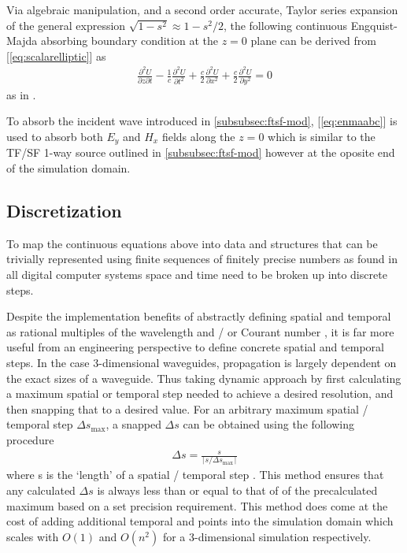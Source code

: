 Via algebraic manipulation, and a second order accurate, Taylor series expansion of the general expression $\sqrt{1-s^2}\approx1-s^2/2$, the following continuous Engquist-Majda absorbing boundary condition at the $z=0$ plane can be derived from  [\ref{eq:scalarelliptic}] as
\begin{align}
	\frac{\partial^2 U}{\partial z\partial t}-\frac{1}{c}\frac{\partial^2 U}{\partial t^2}+\frac{c}{2}\frac{\partial^2 U}{\partial x^2}+\frac{c}{2}\frac{\partial^2 U}{\partial y^2}=0
	\label{eq:enmaabc}
\end{align}
as in \cite{taftlovefdtd}.

To absorb the incident wave introduced in \ref{subsubsec:ftsf-mod},  [\ref{eq:enmaabc}] is used to absorb both $E_y$ and $H_x$ fields along the $z=0$ which is similar to the TF/SF 1-way source outlined in \ref{subsubsec:ftsf-mod} however at the oposite end of the simulation domain.


\subsection{Discretization}
\label{subsec:discretization}
To map the continuous equations above into data and structures that can be trivially represented using finite sequences of finitely precise numbers as found in all digital computer systems space and time need to be broken up into discrete steps.

Despite the implementation benefits of abstractly defining spatial and temporal as rational multiples of the wavelength and / or Courant number \cite{ufdtd}, it is far more useful from an engineering perspective to define concrete spatial and temporal steps. In the case 3-dimensional waveguides, propagation is largely dependent on the exact sizes of a waveguide. Thus taking dynamic approach by first calculating a maximum spatial or temporal step needed to achieve a desired resolution, and then snapping that to a desired value. For an arbitrary maximum spatial / temporal step $\Delta s_{\max}$, a snapped $\Delta s$ can be obtained using the following procedure
\begin{align}
	\Delta s = \frac{s}{\lceil s / \Delta s_{\max}\rceil}
	\label{eq:snapping}
\end{align}
where s is the `length' of a spatial / temporal step \cite{empossible}. This method ensures that any calculated $\Delta s$ is always less than or equal to that of of the precalculated maximum based on a set precision requirement. This method does come at the cost of adding additional temporal and points into the simulation domain which scales with $O(1)$ and $O(n^2)$ for a 3-dimensional simulation respectively.

